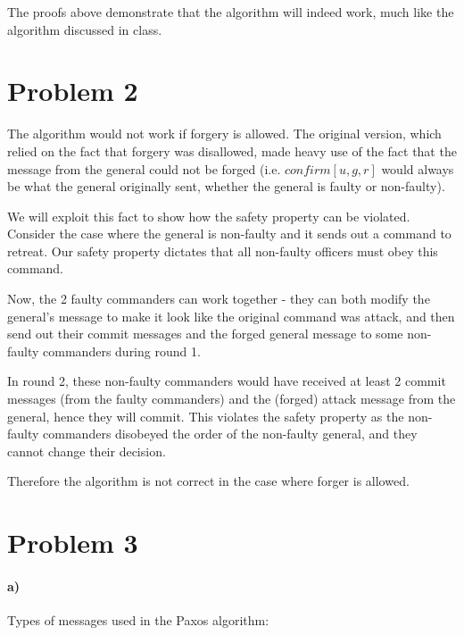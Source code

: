 \documentclass[10pt,letter]{article}
\begin{document}
The proofs above demonstrate that the algorithm will indeed work, much like the algorithm discussed in class.

\section*{Problem 2}

The algorithm would not work if forgery is allowed. The original version, which relied on the fact that forgery was disallowed, made heavy use of the fact that the message from the general could not be forged (i.e. $confirm[u,g,r]$ would always be what the general originally sent, whether the general is faulty or non-faulty). 

We will exploit this fact to show how the safety property can be violated. Consider the case where the general is non-faulty and it sends out a command to retreat. Our safety property dictates that all non-faulty officers must obey this command.

Now, the 2 faulty commanders can work together - they can both modify the general's message to make it look like the original command was attack, and then send out their commit messages and the forged general message to some non-faulty commanders during round 1.

In round 2, these non-faulty commanders would have received at least 2 commit messages (from the faulty commanders) and the (forged) attack message from the general, hence they will commit. This violates the safety property as the non-faulty commanders disobeyed the order of the non-faulty general, and they cannot change their decision.

Therefore the algorithm is not correct in the case where forger is allowed.

\pagebreak

\section*{Problem 3}

\paragraph{a)} Types of messages used in the Paxos algorithm:
\end{document}
